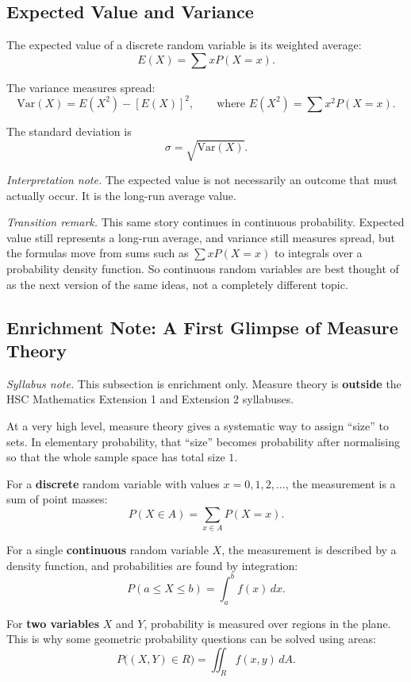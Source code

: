 \subsection{Expected Value and Variance}

The expected value of a discrete random variable is its weighted average:
\[
E(X)=\sum xP(X=x).
\]

The variance measures spread:
\[
\mathrm{Var}(X)=E(X^2)-[E(X)]^2,
\qquad \text{where } E(X^2)=\sum x^2P(X=x).
\]

The standard deviation is
\[
\sigma=\sqrt{\mathrm{Var}(X)}.
\]

\textit{Interpretation note.} The expected value is not necessarily an outcome that must actually occur. It is the long-run average value.

\textit{Transition remark.} This same story continues in continuous probability. Expected value still represents a long-run average, and variance still measures spread, but the formulas move from sums such as $\sum xP(X=x)$ to integrals over a probability density function. So continuous random variables are best thought of as the next version of the same ideas, not a completely different topic.

\subsection{Enrichment Note: A First Glimpse of Measure Theory}

\textit{Syllabus note.} This subsection is enrichment only. Measure theory is \textbf{outside} the HSC Mathematics Extension 1 and Extension 2 syllabuses.

At a very high level, measure theory gives a systematic way to assign ``size'' to sets. In elementary probability, that ``size'' becomes probability after normalising so that the whole sample space has total size $1$.

For a \textbf{discrete} random variable with values $x=0,1,2,\dots$, the measurement is a sum of point masses:
\[
P(X\in A)=\sum_{x\in A} P(X=x).
\]

For a single \textbf{continuous} random variable $X$, the measurement is described by a density function, and probabilities are found by integration:
\[
P(a\le X\le b)=\int_a^b f(x)\,dx.
\]

For \textbf{two variables} $X$ and $Y$, probability is measured over regions in the plane. This is why some geometric probability questions can be solved using areas:
\[
P\big((X,Y)\in R\big)=\iint_R f(x,y)\,dA.
\]

